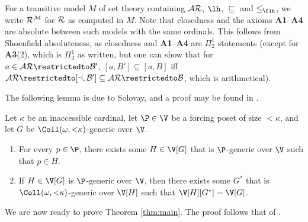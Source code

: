 \documentclass[11pt,reqno]{amsart}
\begin{document}
For a transitive model $M$ of set theory containing $\cal{AR}$, $\lh$, $\sqsubseteq$ and $\leq_\fin$, we write $\cal{R}^M$ for $\cal{R}$ as computed in $M$. Note that closedness and the axioms \textbf{A1}--\textbf{A4} are absolute between such models with the same ordinals. This follows from Shoenfield absoluteness, as closedness and \textbf{A1}--\textbf{A4} are $\Pi_2^1$ statements (except for \textbf{A3}(2), which is $\Pi_3^1$ as written, but one can show that for $a \in \cal{AR}\restrictedto B'$, $[a,B'] \subseteq [a,B]$ iff $\cal{AR}\restrictedto[a,B'] \subseteq \cal{AR}\restrictedto B$, which is arithmetical).

The following lemma is due to Solovay, and a proof may be found in \cite{Sol70}.

\begin{lemma}[Solovay]
\label{lem:Solovay}
    Let $\kappa$ be an inaccessible cardinal, let $\P \in \V$ be a forcing poset of size $<\kappa$, and let $G$ be $\Coll(\omega,{<}\kappa)$-generic over $\V$.
    \begin{enumerate}
        \item For every $p \in \P$, there exists some $H \in \V[G]$ that is $\P$-generic over $\V$ such that $p \in H$.

        \item If $H \in \V[G]$ is $\P$-generic over $\V$, then there exists some $G^*$ that is $\Coll(\omega,{<}\kappa)$-generic over $\V[H]$ such that $\V[H][G^*] = \V[G]$.
    \end{enumerate}
\end{lemma}

We are now ready to prove Theorem \ref{thm:main}. The proof follows that of \cite[Theorem 1.7]{Y25}.
\end{document}
